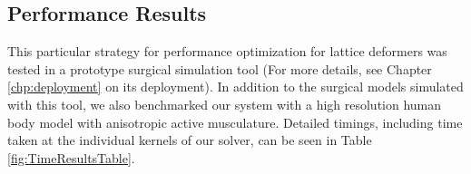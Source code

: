 \subsection{Performance Results}

This particular strategy for performance optimization for lattice
deformers was tested in a prototype surgical simulation tool (For more
details, see Chapter \ref{chp:deployment} on its deployment). In
addition to the surgical models simulated with this tool, we also
benchmarked our system with a high resolution human body model with
anisotropic active musculature. Detailed timings, including
time taken at the individual kernels of our solver, can be seen in Table
\ref{fig:TimeResultsTable}.






